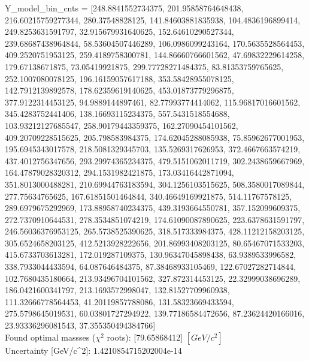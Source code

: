\documentclass[12pt]{article}
\begin{document}
	Y\_model\_bin\_cnts = [248.8841552734375, 201.95858764648438, 216.60215759277344, 280.37548828125, 141.84603881835938, 104.4836196899414, 249.8253631591797, 32.915679931640625, 152.64610290527344, 239.68687438964844, 58.53604507446289, 106.0986099243164, 170.5635528564453, 409.2520751953125, 259.4189758300781, 144.86660766601562, 47.69832229614258, 179.67138671875, 73.05419921875, 299.77728271484375, 83.81353759765625, 252.1007080078125, 196.16159057617188, 353.58428955078125, 142.7912139892578, 178.62359619140625, 453.01873779296875, 377.9122314453125, 94.9889144897461, 82.77993774414062, 115.96817016601562, 345.4283752441406, 138.16693115234375, 557.5431518554688, 103.93212127685547, 258.90179443359375, 162.27090454101562, 409.20709228515625, 205.798583984375, 174.62045288085938, 75.85962677001953, 195.6945343017578, 218.5081329345703, 135.5269317626953, 372.4667663574219, 437.4012756347656, 293.29974365234375, 479.5151062011719, 302.2438659667969, 164.47879028320312, 294.1531982421875, 173.03416442871094, 351.8013000488281, 210.69944763183594, 304.1256103515625, 508.3580017089844, 277.75634765625, 167.61851501464844, 340.46649169921875, 514.11767578125, 289.6979675292969, 173.88958740234375, 439.3193664550781, 357.152099609375, 272.7370910644531, 278.3534851074219, 174.61090087890625, 223.6378631591797, 246.56036376953125, 265.5738525390625, 318.517333984375, 428.11212158203125, 305.6524658203125, 412.5213928222656, 201.86993408203125, 80.65467071533203, 415.6733703613281, 172.019287109375, 130.96347045898438, 63.9389533996582, 338.7933044433594, 64.087646484375, 87.38468933105469, 122.67027282714844, 102.7680435180664, 213.93496704101562, 327.872314453125, 22.32999038696289, 186.0421600341797, 213.1693572998047, 132.81527709960938, 111.32666778564453, 41.20119857788086, 131.58323669433594, 275.5798645019531, 60.03801727294922, 139.77186584472656, 87.23624420166016, 23.93336296081543, 37.355350494384766]\\

    Found optimal massses ($\chi^2$ roots): [79.65868412] $[GeV/c^{2}]$\\
    Uncertainty [GeV/c^2]: 1.4210854715202004e-14\\
\end{document}
